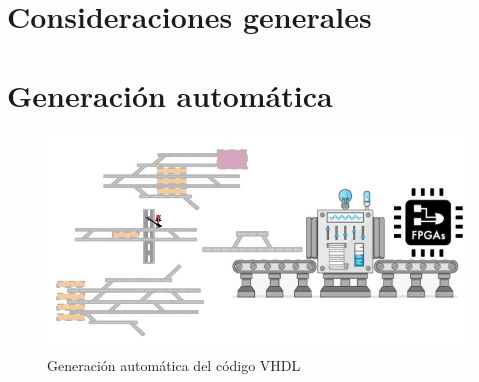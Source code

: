 % 
%
%
%
%
%
%
%
%
%	
%		
%
%		
%		
%		
%		

\section{Consideraciones generales}
\section{Generación automática}

	\begin{figure}[h]
	\centering
		\includegraphics[scale=.3]{./Figures/Generacion}
		\caption{Generación automática del código VHDL}
		\label{fig:hola}
	\end{figure}

